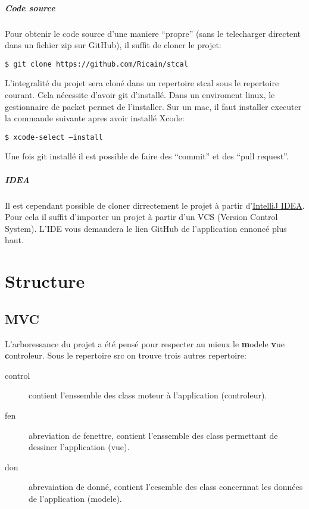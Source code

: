 \documentclass[a4paper,10pt]{report}
\newcommand{\code}[1]{\texttt{#1}}
\begin{document}
			\paragraph[Code source]{Code source}
			Pour obtenir le code source d'une maniere ``propre'' (sans le telecharger directent dans un fichier zip sur GitHub), il suffit de cloner le projet:

			\code{\$ git clone https://github.com/Ricain/stcal}

			L'integralité du projet sera cloné dans un repertoire stcal sous le repertoire courant. Cela nécessite d'avoir git d'installé. Dans un enviroment linux, le gestionnaire de packet permet de l'installer. Sur un mac, il faut installer executer la commande suivante apres avoir installé Xcode:

			\code{\$ xcode-select --install}

			Une fois git installé il est possible de faire des ``commit'' et des ``pull request''.

			\paragraph[IDEA]{IDEA}
			Il est cependant possible de cloner dirrectement le projet à partir d'\href{http://www.jetbrains.com/idea/}{IntelliJ IDEA}. Pour cela il suffit d'importer un projet à partir d'un VCS (Version Control System). L'IDE vous demandera le lien GitHub de l'application ennoncé plus haut.

\chapter{Structure}

	\section{MVC}

	L'arboressance du projet a été pensé pour respecter au mieux le \textbf{m}odele \textbf{v}ue \textbf{c}ontroleur. Sous le repertoire src on trouve trois autres repertoire:
	\begin{description}
		\item[control] contient l'enssemble des class moteur à l'application (controleur).
		\item[fen] abreviation de fenettre, contient l'enssemble des class permettant de dessiner l'application (vue).
		\item[don] abrevaiation de donné, contient l'eesemble des class concernnat les données de l'application (modele).
	\end{description}
\end{document}
